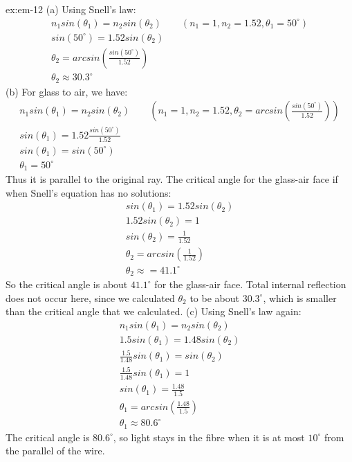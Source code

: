 \begin{solution}{ex:em-12}
  (a) Using Snell's law:
  \[
    \begin{gathered}
      n_1sin(\theta_1)=n_2sin(\theta_2) \qquad (n_1 = 1, n_2 = 1.52, \theta_1 = 50^\circ)\\
      sin(50^\circ) = 1.52 sin(\theta_2)\\
      \theta_2 = arcsin(\frac{sin(50^\circ)}{1.52})\\
      \theta_2 \approx 30.3^\circ
    \end{gathered}
  \]
  (b) For glass to air, we have:
  \[
    \begin{gathered}
      n_1sin(\theta_1)=n_2sin(\theta_2) \qquad (n_1 = 1, n_2 = 1.52, \theta_2 = arcsin(\frac{sin(50^\circ)}{1.52}))\\
      sin(\theta_1) = 1.52 \frac{sin(50^\circ)}{1.52}\\
      sin(\theta_1) = sin(50^\circ)\\
      \theta_1 = 50^\circ
    \end{gathered}
  \]
  Thus it is parallel to the original ray. The critical angle for the glass-air face if when Snell's equation has no solutions:
  \[
    \begin{gathered}
      sin(\theta_1)=1.52sin(\theta_2)\\
      1.52sin(\theta_2) = 1\\
      sin(\theta_2) = \frac{1}{1.52}\\
      \theta_2 = arcsin(\frac{1}{1.52})\\
      \theta_2 \approx = 41.1^\circ
    \end{gathered}
  \]
  So the critical angle is about $41.1^\circ$ for the glass-air face. Total internal reflection does not occur here, since we calculated $\theta_2$ to be about $30.3^\circ$, which is smaller than the critical angle that we calculated.
  (c)
  Using Snell's law again:
  \[
    \begin{gathered}
      n_1 sin(\theta_1)=n_2 sin(\theta_2)\\
      1.5 sin(\theta_1)=1.48 sin(\theta_2)\\
      \frac{1.5}{1.48}sin(\theta_1)=sin(\theta_2)\\
      \frac{1.5}{1.48} sin(\theta_1) = 1\\
      sin(\theta_1) = \frac{1.48}{1.5}\\
      \theta_1 = arcsin(\frac{1.48}{1.5})\\
      \theta_1 \approx 80.6^\circ
    \end{gathered}
  \]
  The critical angle is $80.6^\circ$, so light stays in the fibre when it is at most $10^\circ$ from the parallel of the wire.
\end{solution}
